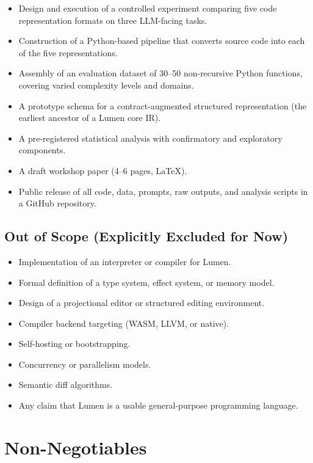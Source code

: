 \documentclass[11pt]{article}
\begin{document}
\begin{itemize}
  \item Design and execution of a controlled experiment comparing five
        code representation formats on three LLM-facing tasks.
  \item Construction of a Python-based pipeline that converts source
        code into each of the five representations.
  \item Assembly of an evaluation dataset of 30--50 non-recursive
        Python functions, covering varied complexity levels and
        domains.
  \item A prototype schema for a contract-augmented structured
        representation (the earliest ancestor of a Lumen core IR).
  \item A pre-registered statistical analysis with confirmatory and
        exploratory components.
  \item A draft workshop paper (4--6 pages, LaTeX).
  \item Public release of all code, data, prompts, raw outputs, and
        analysis scripts in a GitHub repository.
\end{itemize}

\subsection*{Out of Scope (Explicitly Excluded for Now)}

\begin{itemize}
  \item Implementation of an interpreter or compiler for Lumen.
  \item Formal definition of a type system, effect system, or memory
        model.
  \item Design of a projectional editor or structured editing
        environment.
  \item Compiler backend targeting (WASM, LLVM, or native).
  \item Self-hosting or bootstrapping.
  \item Concurrency or parallelism models.
  \item Semantic diff algorithms.
  \item Any claim that Lumen is a usable general-purpose programming
        language.
\end{itemize}


\section{Non-Negotiables}
\label{sec:non-negotiables}
\end{document}
